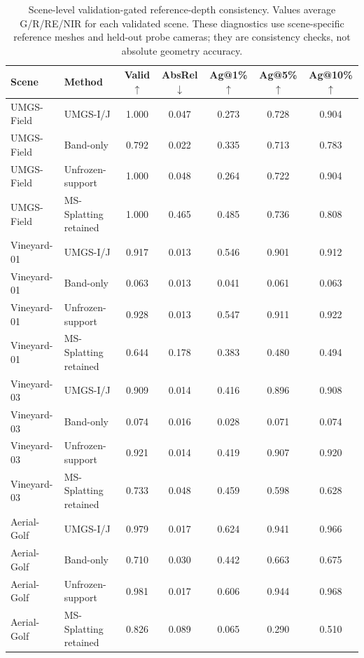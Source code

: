 \begin{table}[t]
    \caption{Scene-level validation-gated reference-depth consistency. Values average G/R/RE/NIR for each validated scene. These diagnostics use scene-specific reference meshes and held-out probe cameras; they are consistency checks, not absolute geometry accuracy.}
    \label{tab:supp-depth-scene}
    \centering
    \scriptsize
    \setlength{\tabcolsep}{3pt}
    \begin{tabular}{llccccc}
        \toprule
        Scene & Method & Valid $\uparrow$ & AbsRel $\downarrow$ & Ag@1\% $\uparrow$ & Ag@5\% $\uparrow$ & Ag@10\% $\uparrow$ \\
        \midrule
        UMGS-Field & UMGS-I/J & 1.000 & 0.047 & 0.273 & 0.728 & 0.904 \\
        UMGS-Field & Band-only & 0.792 & 0.022 & 0.335 & 0.713 & 0.783 \\
        UMGS-Field & Unfrozen-support & 1.000 & 0.048 & 0.264 & 0.722 & 0.904 \\
        UMGS-Field & MS-Splatting retained & 1.000 & 0.465 & 0.485 & 0.736 & 0.808 \\
        \midrule
        Vineyard-01 & UMGS-I/J & 0.917 & 0.013 & 0.546 & 0.901 & 0.912 \\
        Vineyard-01 & Band-only & 0.063 & 0.013 & 0.041 & 0.061 & 0.063 \\
        Vineyard-01 & Unfrozen-support & 0.928 & 0.013 & 0.547 & 0.911 & 0.922 \\
        Vineyard-01 & MS-Splatting retained & 0.644 & 0.178 & 0.383 & 0.480 & 0.494 \\
        \midrule
        Vineyard-03 & UMGS-I/J & 0.909 & 0.014 & 0.416 & 0.896 & 0.908 \\
        Vineyard-03 & Band-only & 0.074 & 0.016 & 0.028 & 0.071 & 0.074 \\
        Vineyard-03 & Unfrozen-support & 0.921 & 0.014 & 0.419 & 0.907 & 0.920 \\
        Vineyard-03 & MS-Splatting retained & 0.733 & 0.048 & 0.459 & 0.598 & 0.628 \\
        \midrule
        Aerial-Golf & UMGS-I/J & 0.979 & 0.017 & 0.624 & 0.941 & 0.966 \\
        Aerial-Golf & Band-only & 0.710 & 0.030 & 0.442 & 0.663 & 0.675 \\
        Aerial-Golf & Unfrozen-support & 0.981 & 0.017 & 0.606 & 0.944 & 0.968 \\
        Aerial-Golf & MS-Splatting retained & 0.826 & 0.089 & 0.065 & 0.290 & 0.510 \\
        \bottomrule
    \end{tabular}
\end{table}
